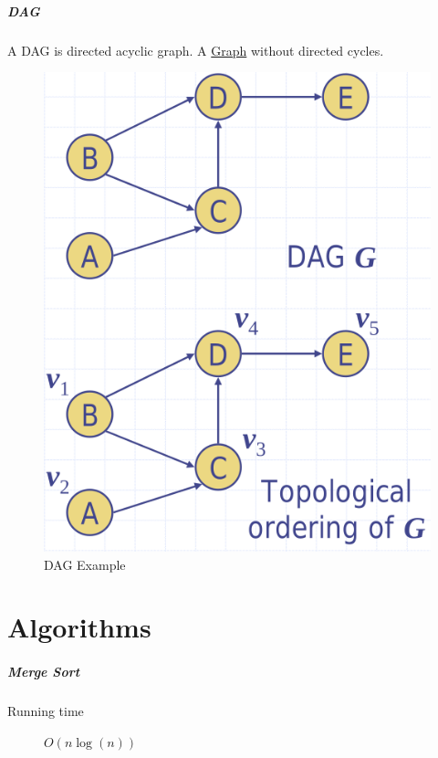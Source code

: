 \documentclass[11pt,twoside,twocolumn,landscape]{article}
\begin{document}
\subparagraph{DAG}
\label{sec:orga079c9b}

A DAG is directed acyclic graph.
A \href{../../../roam/20220201163000-graph.org}{Graph} without directed cycles.


\begin{figure}[htbp]
\centering
\includegraphics[width=.9\linewidth]{img/dag.png}
\caption{\label{fig:orgde1472c}DAG Example}
\end{figure}

\section{Algorithms}
\label{sec:orgaac41d7}
\subparagraph{Merge Sort}
\label{sec:org2d2c744}

\begin{description}
\item[{Running time}] \(O(n \log(n))\)
\end{description}
\end{document}
